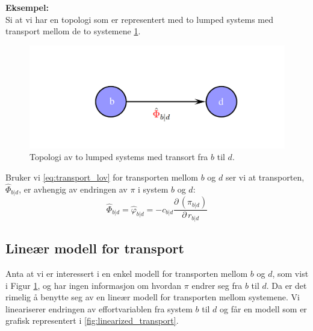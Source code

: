 \textbf{Eksempel:}\\
Si at vi har en topologi som er representert med to lumped systems med transport mellom de to systemene  \cref{fig:transport_topologi1}. 

\begin{figure}[H]
    \centering
    \includegraphics[scale=0.3]{Figures/Transport_topologi.png}
    \caption{Topologi av to lumped systems med transort fra $b$ til $d$.}
    \label{fig:transport_topologi1}
\end{figure}

Bruker vi \cref{eq:transport_lov} for transporten mellom $b$ og $d$ ser vi at transporten, $\hat{\Phi}_{b|d}$, er avhengig av endringen av $\pi$ i system $b$ og $d$: 
\begin{equation}
\hat{\Phi}_{b|d} = \hat{\varphi}_{b|d} = -c_{b|d}\frac{\partial \,( \pi_{b|d})}{\partial \, r_{b|d}}
\end{equation}

\subsection{Lineær modell for transport}\label{sec:linear_transport}
Anta at vi er interessert i en enkel modell for transporten mellom $b$ og $d$, som vist i Figur \ref{fig:transport_topologi1}, og har ingen informasjon om hvordan $\pi$ endrer seg fra $b$ til $d$. Da er det rimelig å benytte seg av en lineær modell for transporten mellom systemene. Vi lineariserer endringen av effortvariablen fra system $b$ til $d$ og får en modell som er grafisk representert i \cref{fig:linearized_transport}. 

